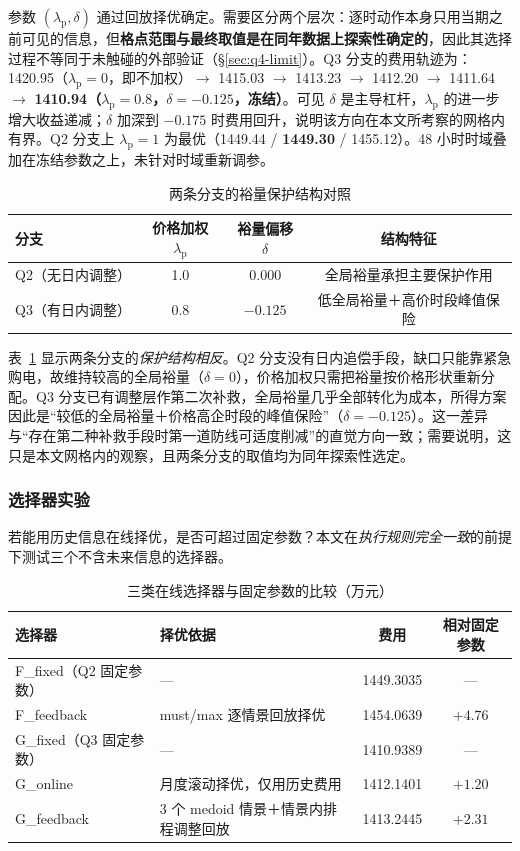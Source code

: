 参数 $(\lambda_{\mathrm{p}},\delta)$ 通过回放择优确定。需要区分两个层次：逐时动作本身只用当期之前可见的信息，但\textbf{格点范围与最终取值是在同年数据上探索性确定的}，因此其选择过程不等同于未触碰的外部验证（\S\ref{sec:q4-limit}）。Q3 分支的费用轨迹为：1420.95（$\lambda_{\mathrm{p}}=0$，即不加权）$\to$ 1415.03 $\to$ 1413.23 $\to$ 1412.20 $\to$ 1411.64 $\to$ \textbf{1410.94（$\lambda_{\mathrm{p}}=0.8$，$\delta=-0.125$，冻结）}。可见 $\delta$ 是主导杠杆，$\lambda_{\mathrm{p}}$ 的进一步增大收益递减；$\delta$ 加深到 $-0.175$ 时费用回升，说明该方向在本文所考察的网格内有界。Q2 分支上 $\lambda_{\mathrm{p}}=1$ 为最优（1449.44 / \textbf{1449.30} / 1455.12）。48 小时时域叠加在冻结参数之上，未针对时域重新调参。

\begin{table}[H]
  \centering
  \caption{两条分支的裕量保护结构对照}
  \label{tab:q4-prm}
  \begin{tabular}{lccc}
    \toprule
    分支 & 价格加权 $\lambda_{\mathrm{p}}$ & 裕量偏移 $\delta$ & 结构特征 \\
    \midrule
    Q2（无日内调整） & 1.0 & 0.000 & 全局裕量承担主要保护作用 \\
    Q3（有日内调整） & 0.8 & $-0.125$ & 低全局裕量＋高价时段峰值保险 \\
    \bottomrule
  \end{tabular}
\end{table}

表~\ref{tab:q4-prm} 显示两条分支的\emph{保护结构相反}。Q2 分支没有日内追偿手段，缺口只能靠紧急购电，故维持较高的全局裕量（$\delta=0$），价格加权只需把裕量按价格形状重新分配。Q3 分支已有调整层作第二次补救，全局裕量几乎全部转化为成本，所得方案因此是``较低的全局裕量＋价格高企时段的峰值保险''（$\delta=-0.125$）。这一差异与``存在第二种补救手段时第一道防线可适度削减''的直觉方向一致；需要说明，这只是本文网格内的观察，且两条分支的取值均为同年探索性选定。

\subsubsection{选择器实验}
\label{sec:q4-selector}

若能用历史信息在线择优，是否可超过固定参数？本文在\emph{执行规则完全一致}的前提下测试三个不含未来信息的选择器。

\begin{table}[H]
  \centering
  \caption{三类在线选择器与固定参数的比较（万元）}
  \label{tab:q4-sel}
  \small
  \begin{tabularx}{\textwidth}{lXcc}
    \toprule
    选择器 & 择优依据 & 费用 & 相对固定参数 \\
    \midrule
    F\_fixed（Q2 固定参数） & — & 1449.3035 & — \\
    F\_feedback & must/max 逐情景回放择优 & 1454.0639 & $+4.76$ \\
    G\_fixed（Q3 固定参数） & — & 1410.9389 & — \\
    G\_online & 月度滚动择优，仅用历史费用 & 1412.1401 & $+1.20$ \\
    G\_feedback & 3 个 medoid 情景＋情景内排程调整回放 & 1413.2445 & $+2.31$ \\
    \bottomrule
  \end{tabularx}
\end{table}

